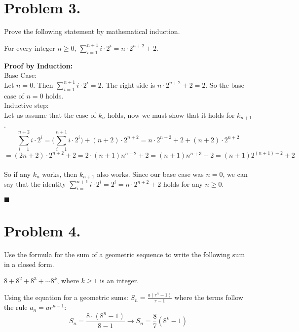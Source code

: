 \documentclass[11pt]{article}
\begin{document}
\newpage

\section*{Problem 3.}

Prove the following statement by mathematical induction.

For every integer $n\geq 0$, $\sum\limits_{i=1}^{n+1}i\cdot 2^i=n\cdot 2^{n+2}+2$.
\newline

{\bf Proof by Induction:}\\

Base Case:\\
Let $n=0$. Then $\sum\limits_{i=1}^{n+1} i\cdot 2^i = 2$. The right side is $n\cdot 2^{n+2}+2 = 2$. So the base case of $n=0$ holds.\\

Inductive step:\\
Let us assume that the case of $k_n$ holds, now we must show that it holds for $k_{n+1}$.\\
\[\sum_{i=1}^{n+2} i \cdot 2^i = \Big(\sum_{i=1}^{n+1} i \cdot 2^i\Big) + (n+2)\cdot 2^{n+2} = n\cdot 2^{n+2} +2 + (n+2)\cdot 2^{n+2}\]
\[= (2n+2)\cdot 2^{n+2} +2 = 2\cdot(n+1)n^{n+2} + 2 = (n+1)n^{n+3} + 2 = (n+1)2^{(n+1)+2} + 2\]
\\
So if any $k_n$ works, then $k_{n+1}$ also works. Since our base case was $n=0$, we can say that the identity $\sum\limits_{i=}^{n+1} i\cdot 2^i = 2^i=n\cdot 2^{n+2}+2$ holds for any $n\geq 0$.
\begin{flushright}$\blacksquare$\end{flushright}




\newpage

\noindent
\section*{Problem 4.}

Use the formula for the sum of a geometric sequence to write the following sum in a closed form.
\newline

$8+8^2+8^3+\cdots 8^k$, where $k\geq 1$ is an integer.
\newline

Using the equation for a geometric sums: $S_n = \frac{a(r^n -1)}{r-1}$ where the terms follow the rule $a_n = ar^{n-1}$:
\[S_n = \frac{8\cdot (8^n -1)}{8-1} \rightarrow S_n =\frac{8}{7}(8^k -1)\]
\end{document}
